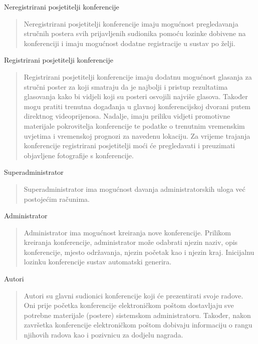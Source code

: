 			
			\begin{packed_enum}
				\item Neregistrirani posjetitelji konferencije
				
			\begin{quote}
				Neregistrirani posjetitelji konferencije imaju mogućnost pregledavanja stručnih postera svih prijavljenih sudionika pomoću lozinke dobivene na konferenciji i imaju mogućnost dodatne registracije u sustav po želji.
			\end{quote}
				
				\item Registrirani posjetitelji konferencije
				
		\begin{quote}
			Registrirani posjetitelji konferencije imaju dodatnu mogućnost glasanja za stručni poster za koji smatraju da je najbolji i pristup rezultatima glasovanja kako bi vidjeli koji su posteri osvojili najviše glasova. Također mogu pratiti trenutna događanja u glavnoj konferencijskoj dvorani putem direktnog videoprijenosa. Nadalje, imaju priliku vidjeti promotivne materijale pokrovitelja konferencije te podatke o trenutnim vremenskim uvjetima i vremenskoj prognozi za navedenu lokaciju. Za vrijeme trajanja konferencije registrirani posjetitelji moći će pregledavati i preuzimati objavljene fotografije s konferencije.
		\end{quote}
		
				\item Superadministrator
				\begin{quote}
					Superadministrator ima mogućnost davanja administratorskih uloga već postojećim računima.
				\end{quote}
				
				\item Administrator
				\begin{quote}
					Administrator ima mogućnost kreiranja nove konferencije. Prilikom kreiranja konferencije, administrator može odabrati njezin naziv, opis konferencije, mjesto održavanja, njezin početak kao i njezin kraj. Inicijalnu lozinku konferencije sustav automatski generira.
				\end{quote}
				
				\item Autori
				\begin{quote}
					Autori su glavni sudionici konferencije koji će prezentirati svoje radove. Oni prije početka konferencije elektroničkom poštom dostavljaju sve potrebne materijale (postere) sistemskom administratoru. Također, nakon završetka konferencije elektroničkom poštom dobivaju informaciju o rangu njihovih radova kao i pozivnicu za dodjelu nagrada.
				\end{quote}
				

\end{packed_enum}
